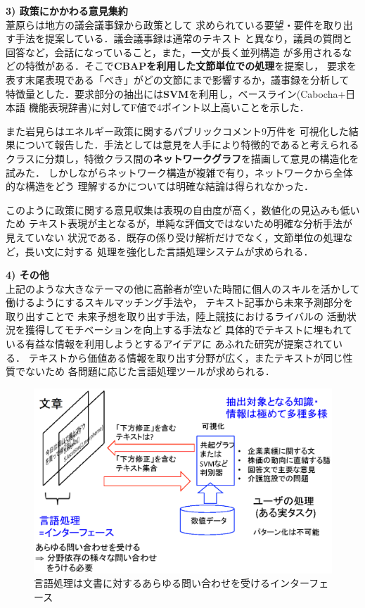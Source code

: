 \documentclass[twocolumn]{jarticle}
\begin{document}
{{\bf 3) 政策にかかわる意見集約}\\
葦原ら\cite{ashihara2012}は地方の議会議事録から政策として
求められている要望・要件を取り出す手法を提案している．議会議事録は通常のテキスト
と異なり，議員の質問と回答など，会話になっていること，また，一文が長く並列構造
が多用されるなどの特徴がある．そこで{\bf CBAP\cite{maruyama2003}を利用した文節単位での処理}を提案し，
要求を表す末尾表現である「べき」がどの文節にまで影響するか，議事録を分析して
特徴量とした．要求部分の抽出には{\bf SVM}を利用し，ベースライン(Cabocha+日本語
機能表現辞書)に対してF値で4ポイント以上高いことを示した．

また岩見ら\cite{iwami2016}はエネルギー政策に関するパブリックコメント9万件を
可視化した結果について報告した．手法としては意見を人手により特徴的であると考えられる
クラスに分類し，特徴クラス間の{\bf ネットワークグラフ}を描画して意見の構造化を試みた．
しかしながらネットワーク構造が複雑で有り，ネットワークから全体的な構造をどう
理解するかについては明確な結論は得られなかった．

このように政策に関する意見収集は表現の自由度が高く，数値化の見込みも低いため
テキスト表現が主となるが，単純な評価文ではないため明確な分析手法が見えていない
状況である．既存の係り受け解析だけでなく，文節単位の処理など，長い文に対する
処理を強化した言語処理システムが求められる．

{\bf 4) その他}\\
上記のような大きなテーマの他に高齢者が空いた時間に個人のスキルを活かして
働けるようにするスキルマッチング手法\cite{miura2015}や，
テキスト記事から未来予測部分を取り出すことで
未来予想を取り出す手法\cite{shimaoka2015}，陸上競技におけるライバルの
活動状況を獲得してモチベーションを向上する手法\cite{sano2016}など
具体的でテキストに埋もれている有益な情報を利用しようとするアイデアに
あふれた研究が提案されている．
テキストから価値ある情報を取り出す分野が広く，またテキストが同じ性質でないため
各問題に応じた言語処理ツールが求められる．


\begin{figure}[t]
\begin{center}
\includegraphics[scale=0.5]{fig/lang.eps}
\end{center}
\caption {言語処理は文書に対するあらゆる問い合わせを受けるインターフェース}
\label{fig:interface}
\end{figure}


}
\end{document}
